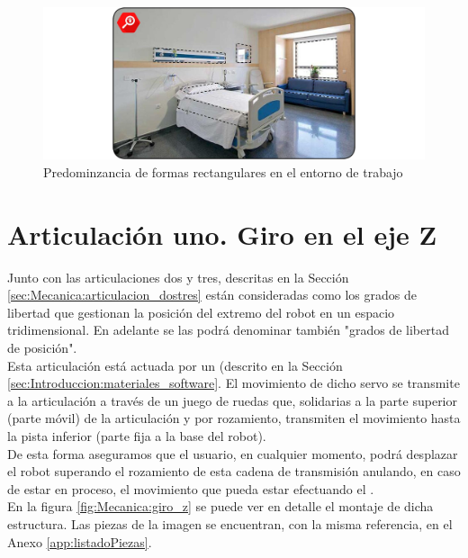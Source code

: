     \begin{figure}[H]
        \centering
        \includegraphics[width=\textwidth]{figuras/Imagenes_Mecanica/verdad_de_formas.jpg}
        \caption{Predominzancia de formas rectangulares en el entorno de trabajo}
        \label{fig:Mecanica:verdad_formas}
    \end{figure}

\section{Articulación uno. Giro en el eje Z} \label{sec:Mecanica:articulacion_uno}
    Junto con las articulaciones dos y tres, descritas en la Sección \ref{sec:Mecanica:articulacion_dostres} están consideradas como los grados de libertad que gestionan la posición del extremo del robot en un espacio tridimensional. En adelante se las podrá denominar también "grados de libertad de posición".
    \\

    Esta articulación está actuada por un  (descrito en la Sección \ref{sec:Introduccion:materiales_software}. El movimiento de dicho servo se transmite a la articulación a través de un juego de ruedas que, solidarias a la parte superior (parte móvil) de la articulación y por rozamiento, transmiten el movimiento hasta la pista inferior (parte fija a la base del robot).
    \\

    De esta forma aseguramos que el usuario, en cualquier momento, podrá desplazar el robot superando el rozamiento de esta cadena de transmisión anulando, en caso de estar en proceso, el movimiento que pueda estar efectuando el .
	\\
	En la figura \ref{fig:Mecanica:giro_z} se puede ver en detalle el montaje de dicha estructura. Las piezas de la imagen se encuentran, con la misma referencia, en el Anexo \ref{app:listadoPiezas}.

